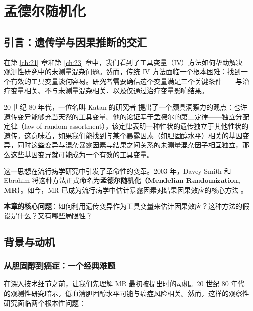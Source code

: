 
\chapter{孟德尔随机化}\label{ch:25}

\section{引言：遗传学与因果推断的交汇}\label{sec:25-intro}

在第 \ref{ch:21} 章和第 \ref{ch:23} 章中，我们看到了工具变量（IV）方法如何帮助解决观测性研究中的未测量混杂问题。然而，传统 IV 方法面临一个根本困难：找到一个有效的工具变量谈何容易。研究者需要确信这个变量满足三个关键条件——与治疗变量相关、不与未测量混杂相关、以及仅通过治疗变量影响结果。

20 世纪 80 年代，一位名叫 Katan 的研究者 \citep{Katan1986} 提出了一个颇具洞察力的观点：也许遗传变异能够充当天然的工具变量。他的论证基于孟德尔的第二定律——独立分配定律（law of random assortment），该定律表明一种性状的遗传独立于其他性状的遗传。这意味着，如果我们能找到与某个暴露因素（如胆固醇水平）相关的基因变异，同时这些变异与混杂暴露因素与结果之间关系的未测量混杂因子相互独立，那么这些基因变异就可能成为一个有效的工具变量。

这一思想在流行病学研究中引发了革命性的变革。2003 年，Davey Smith 和 Ebrahim \citep{DaveySmith2003} 将这种方法正式命名为\textbf{孟德尔随机化（Mendelian Randomization, MR）}。如今，MR 已成为流行病学中估计暴露因素对结果因果效应的核心方法 \citep{VanderWeele2014}。

\textbf{本章的核心问题}：如何利用遗传变异作为工具变量来估计因果效应？这种方法的假设是什么？又有哪些局限性？

\section{背景与动机}\label{sec:25-background}

\subsection{从胆固醇到癌症：一个经典难题}\label{sec:25-cholesterol-example}

在深入技术细节之前，让我们先理解 MR 最初被提出时的动机。20 世纪 80 年代的观测性研究暗示，低血清胆固醇水平可能与癌症风险相关。然而，这样的观察性研究面临两个根本性问题：

